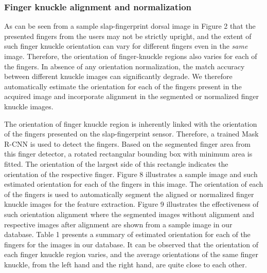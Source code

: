 \subsubsection{Finger knuckle alignment and normalization}

As can be seen from a sample slap-fingerprint dorsal image in Figure 2 that the presented fingers from the users may not be strictly upright, and the extent of such finger knuckle orientation can vary for different fingers even in the \textit{same} image. Therefore, the orientation of finger-knuckle regions also varies for each of the fingers. In absence of any orientation normalization, the match accuracy between different knuckle images can significantly degrade. We therefore automatically estimate the orientation for each of the fingers present in the acquired image and incorporate alignment in the segmented or normalized finger knuckle images.

The orientation of finger knuckle region is inherently linked with the orientation of the fingers presented on the slap-fingerprint sensor. Therefore, a trained Mask R-CNN is used to detect the fingers. Based on the segmented finger area from this finger detector, a rotated rectangular bounding box with minimum area is fitted. The orientation of the largest side of this rectangle indicates the orientation of the respective finger. Figure 8 illustrates a sample image and such estimated orientation for each of the fingers in this image. The orientation of each of the fingers is used to automatically segment the aligned or normalized finger knuckle images for the feature extraction. Figure 9 illustrates the effectiveness of such orientation alignment where the segmented images without alignment and respective images after alignment are shown from a sample image in our database. Table 1 presents a summary of estimated orientation for each of the fingers for the images in our database. It can be observed that the orientation of each finger knuckle region varies, and the average orientations of the same finger knuckle, from the left hand and the right hand, are quite close to each other.

